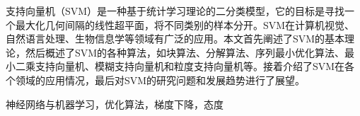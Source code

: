 
\clearpage

\setcounter{page}{1}



支持向量机（SVM）是一种基于统计学习理论的二分类模型，它的目标是寻找一个最大化几何间隔的线性超平面，将不同类别的样本分开。SVM在计算机视觉、自然语言处理、生物信息学等领域有广泛的应用。本文首先阐述了SVM的基本理论，然后概述了SVM的各种算法，如块算法、分解算法、序列最小优化算法、最小二乘支持向量机、模糊支持向量机和粒度支持向量机等。接着介绍了SVM在各个领域的应用情况，最后对SVM的研究问题和发展趋势进行了展望。

\vspace{\baselineskip}
 神经网络与机器学习，优化算法，梯度下降，态度



\titlespacing{\chapter}{0pt}{-6mm}{5mm}
